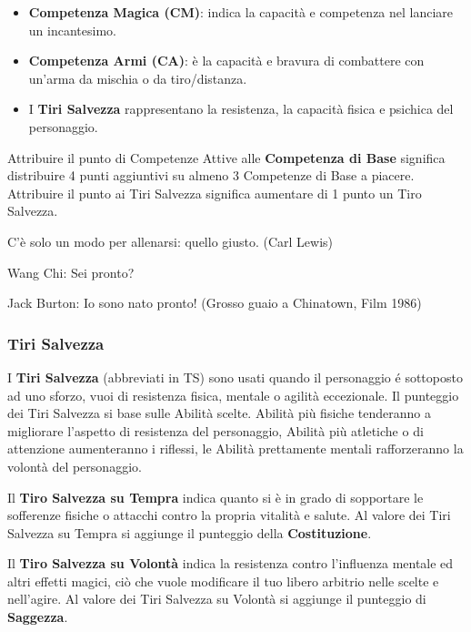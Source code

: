\begin{multicols}{2}
\begin{itemize}[leftmargin=*]
\item \textbf{Competenza Magica (CM)}:  indica la capacità e competenza nel lanciare un incantesimo.

\item \textbf{Competenza Armi (CA)}:  è la capacità e bravura di combattere con un'arma da mischia o da tiro/distanza.

\item I \textbf{Tiri Salvezza} rappresentano la resistenza, la capacità fisica e psichica del personaggio.
\end{itemize}

Attribuire il punto di Competenze Attive alle \textbf{Competenza di Base} significa distribuire 4 punti aggiuntivi su almeno 3 Competenze di Base a piacere. Attribuire il punto ai Tiri Salvezza significa aumentare di 1 punto un Tiro Salvezza.

\medskip

\begin{enfasi}{C'è solo un modo per allenarsi: quello giusto. (Carl Lewis)
\medskip

Wang Chi: Sei pronto?

Jack Burton: Io sono nato pronto! (Grosso guaio a Chinatown, Film 1986)
}\end{enfasi}

\subsubsection{Tiri Salvezza}\label{tirisavellza}

I \textbf{Tiri Salvezza} (abbreviati in TS) sono usati quando il personaggio é sottoposto ad uno sforzo, vuoi di resistenza fisica, mentale o agilità eccezionale. Il punteggio dei Tiri Salvezza si base sulle Abilità scelte. Abilità più fisiche tenderanno a migliorare l'aspetto di resistenza del personaggio, Abilità più atletiche o di attenzione aumenteranno i riflessi, le Abilità prettamente mentali rafforzeranno la volontà del personaggio.

Il \textbf{Tiro Salvezza su Tempra} indica quanto si è in grado di sopportare le sofferenze fisiche o attacchi contro la propria vitalità e salute. Al valore dei Tiri Salvezza su Tempra si aggiunge il punteggio della \textbf{Costituzione}.

Il \textbf{Tiro Salvezza su Volontà} indica la resistenza contro l'influenza mentale ed altri effetti magici, ciò che vuole modificare il tuo libero arbitrio nelle scelte e nell'agire. Al valore dei Tiri Salvezza su Volontà si aggiunge il punteggio di \textbf{Saggezza}.


\end{multicols}
